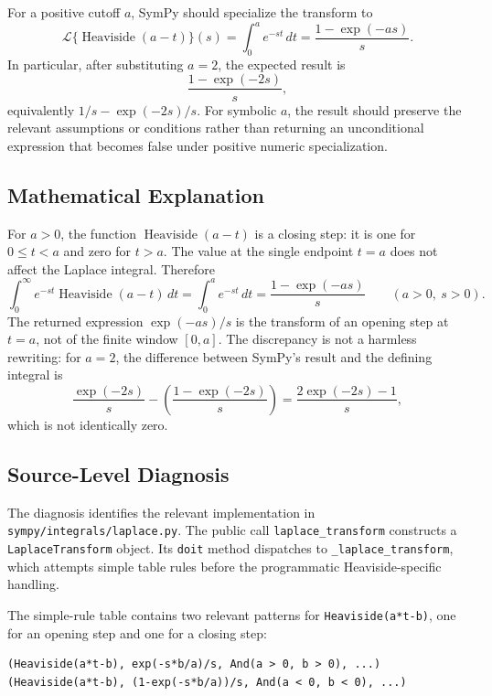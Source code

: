 \documentclass[11pt]{article}
\begin{document}
For a positive cutoff \(a\), SymPy should specialize the transform to
\[
  \mathcal{L}\{\operatorname{Heaviside}(a-t)\}(s)
  = \int_0^a e^{-st}\,dt
  = \frac{1-\exp(-as)}{s}.
\]
In particular, after substituting \(a=2\), the expected result is
\[
  \frac{1-\exp(-2s)}{s},
\]
equivalently \(1/s-\exp(-2s)/s\).  For symbolic \(a\), the result should
preserve the relevant assumptions or conditions rather than returning an
unconditional expression that becomes false under positive numeric
specialization.

\subsection{Mathematical Explanation}

For \(a>0\), the function \(\operatorname{Heaviside}(a-t)\) is a closing step:
it is one for \(0\leq t<a\) and zero for \(t>a\).  The value at the single
endpoint \(t=a\) does not affect the Laplace integral.  Therefore
\[
  \int_0^\infty e^{-st}\operatorname{Heaviside}(a-t)\,dt
  =
  \int_0^a e^{-st}\,dt
  =
  \frac{1-\exp(-as)}{s}
  \qquad (a>0,\ s>0).
\]
The returned expression \(\exp(-as)/s\) is the transform of an opening step at
\(t=a\), not of the finite window \([0,a]\).  The discrepancy is not a harmless
rewriting: for \(a=2\), the difference between SymPy's result and the defining
integral is
\[
  \frac{\exp(-2s)}{s} - \left(\frac{1-\exp(-2s)}{s}\right)
  =
  \frac{2\exp(-2s)-1}{s},
\]
which is not identically zero.

\subsection{Source-Level Diagnosis}

The diagnosis identifies the relevant implementation in
\nolinkurl{sympy/integrals/laplace.py}.  The public call
\nolinkurl{laplace_transform} constructs a \nolinkurl{LaplaceTransform} object.
Its \nolinkurl{doit} method dispatches to \nolinkurl{_laplace_transform}, which
attempts simple table rules before the programmatic Heaviside-specific handling.

The simple-rule table contains two relevant patterns for
\texttt{Heaviside(a*t-b)}, one for an opening step and one for a closing step:

\begin{lstlisting}[style=bugpython]
(Heaviside(a*t-b), exp(-s*b/a)/s, And(a > 0, b > 0), ...)
(Heaviside(a*t-b), (1-exp(-s*b/a))/s, And(a < 0, b < 0), ...)
\end{lstlisting}
\end{document}
